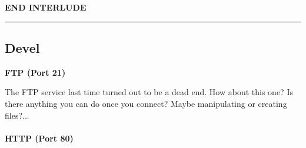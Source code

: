 \documentclass[a4paper,11pt]{article}
\begin{document}
\vspace*{\fill}
\begin{center}
    {\bfseries END INTERLUDE}
\par\noindent\rule{\textwidth}{0.4pt}
\end{center}
\pagebreak







\begin{center}
\subsection{Devel}
\end{center}

{\bfseries FTP (Port 21)}

The FTP service last time turned out to be a dead end. How about this one? Is there anything you can do once you connect? Maybe manipulating or creating files?...
\\
\\
{\bfseries HTTP (Port 80)}
\end{document}
